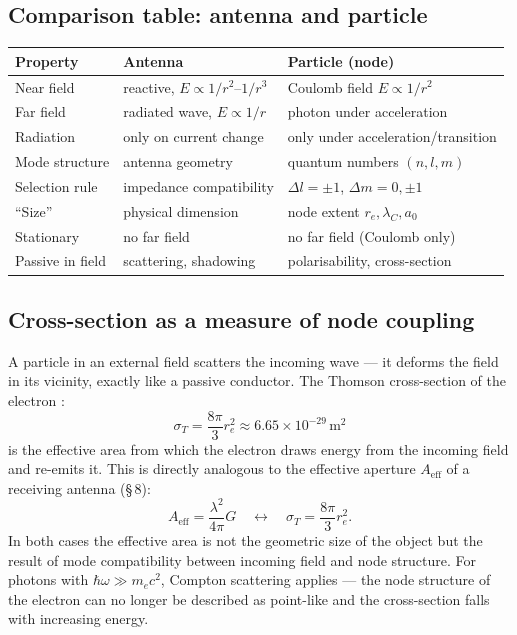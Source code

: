 \subsection*{Comparison table: antenna and particle}

\begin{center}
\begin{tabular}{@{}lll@{}}
\toprule
\textbf{Property} & \textbf{Antenna} & \textbf{Particle (node)} \\
\midrule
Near field & reactive, $E\propto 1/r^2$--$1/r^3$ & Coulomb field $E\propto 1/r^2$ \\
Far field & radiated wave, $E\propto 1/r$ & photon under acceleration \\
Radiation & only on current change & only under acceleration/transition \\
Mode structure & antenna geometry & quantum numbers $(n,l,m)$ \\
Selection rule & impedance compatibility & $\Delta l=\pm1$, $\Delta m=0,\pm1$ \\
``Size'' & physical dimension & node extent $r_e,\lambda_C,a_0$ \\
Stationary & no far field & no far field (Coulomb only) \\
Passive in field & scattering, shadowing & polarisability, cross-section \\
\bottomrule
\end{tabular}
\end{center}

\subsection*{Cross-section as a measure of node coupling}

A particle in an external field scatters the incoming wave --- it deforms
the field in its vicinity, exactly like a passive conductor. The Thomson
cross-section of the electron \cite{Jackson1999}:
\[
  \sigma_T = \frac{8\pi}{3}r_e^2 \approx 6.65\times 10^{-29}\,\mathrm{m}^2
\]
is the effective area from which the electron draws energy from the
incoming field and re-emits it. This is directly analogous to the effective
aperture $A_\mathrm{eff}$ of a receiving antenna (\S\,8):
\[
  A_\mathrm{eff} = \frac{\lambda^2}{4\pi}G
  \quad \longleftrightarrow \quad
  \sigma_T = \frac{8\pi}{3}r_e^2.
\]
In both cases the effective area is not the geometric size of the object
but the result of mode compatibility between incoming field and node
structure. For photons with $\hbar\omega \gg m_e c^2$, Compton scattering
applies --- the node structure of the electron can no longer be described
as point-like and the cross-section falls with increasing energy.

